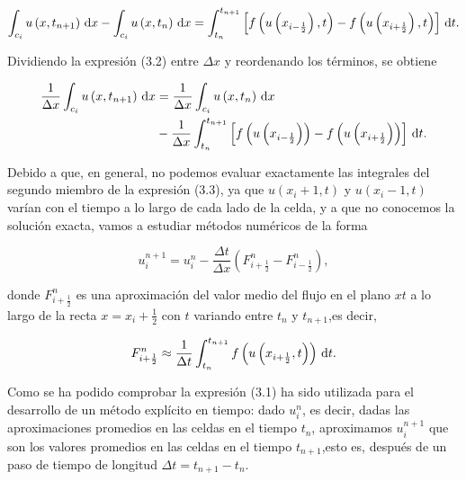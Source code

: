 \begin{equation*}
  \int_{c_{i}}
  u\left(x,t_{n+1}\right)\dl x-
  \int_{c_{i}}
  u\left(x,t_{n}\right)\dl x=
  \int_{t_{n}}^{t_{n+1}}
  \left[
    f\left(u\left(x_{i-\frac{1}{2}}\right),t\right)-
    f\left(u\left(x_{i+\frac{1}{2}}\right),t\right)
    \right]\dl t.
\end{equation*}

Dividiendo la expresión (3.2) entre $\Delta x$ y reordenando los
términos, se obtiene

\begin{gather*}
  \begin{split}
    \frac{1}{\Delta x}
    \int_{c_{i}}
    u\left(x,t_{n+1}\right)\dl x
     & =
    \frac{1}{\Delta x}
    \int_{c_{i}}
    u\left(x,t_{n}\right)\dl x \\
     & -
    \frac{1}{\Delta x}
    \int_{t_{n}}^{t_{n+1}}
    \left[
      f\left(u\left(x_{i-\frac{1}{2}}\right)\right)-
      f\left(u\left(x_{i+\frac{1}{2}}\right)\right)
      \right]\dl t.
  \end{split}
\end{gather*}

Debido a que, en general, no podemos evaluar exactamente las
integrales del segundo miembro de la expresión (3.3), ya que
$u\left(x_{i}+1,t\right)$ y $u\left(x_{i}-1,t\right)$ varían con el
tiempo a lo largo de cada lado de la celda, y a que no conocemos la
solución exacta, vamos a estudiar métodos numéricos de la forma

\begin{equation*}
  u^{n+1}_{i}=
  u^{n}_{i}-
  \frac{\Delta t}{\Delta x}
  \left(
  F^{n}_{i+\frac{1}{2}}-
  F^{n}_{i-\frac{1}{2}}
  \right),
\end{equation*}

donde $F^{n}_{i+\frac{1}{2}}$ es una aproximación del valor medio del
flujo en el plano $xt$ a lo largo de la recta $x=x_{i}+\frac{1}{2}$
con $t$ variando entre $t_{n}$ y $t_{n+1}$,es decir,

\begin{equation*}
  F^{n}_{i+\frac{1}{2}}\approx
  \frac{1}{\Delta t}
  \int_{t_{n}}^{t_{n+1}}
  f
  \left(
  u
  \left(x_{i+\frac{1}{2}},t\right)
  \right)
  \dl t.
\end{equation*}

Como se ha podido comprobar la expresión (3.1) ha sido utilizada para
el desarrollo de un método explícito en tiempo: dado $u^{n}_{i}$, es
decir, dadas las aproximaciones promedios en las celdas en el tiempo
$t_{n}$, aproximamos $u^{n+1}_{i}$ que son los valores promedios en
las celdas en el tiempo $t_{n+1}$,esto es, después de un paso de
tiempo de longitud $\Delta t=t_{n+1}-t_{n}$.

